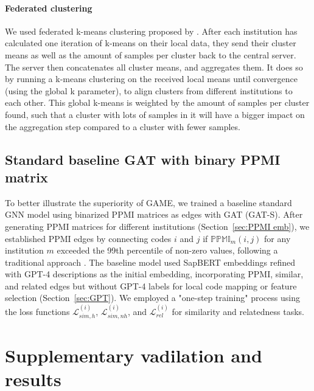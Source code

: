 \documentclass{article}
\begin{document}
\paragraph{Federated clustering}
We used federated k-means clustering proposed by \cite{garst2024fed}. After each institution has calculated one iteration of k-means on their local data, they send their cluster means as well as the amount of samples per cluster back to the central server. The server then concatenates all cluster means, and aggregates them. It does so by running a k-means clustering on the received local means until convergence (using the global k parameter), to align clusters from different institutions to each other. This global k-means is weighted by the amount of samples per cluster found, such that a cluster with lots of samples in it will have a bigger impact on the aggregation step compared to a cluster with
fewer samples.



\subsection{Standard baseline GAT with binary PPMI matrix}
\label{sec:naive}

To better illustrate the superiority of GAME, we trained a baseline standard GNN model using binarized PPMI matrices as edges with GAT (GAT-S). After generating PPMI matrices for different institutions (Section~\ref{sec:PPMI emb}), we established PPMI edges by connecting codes $i$ and $j$ if $\mathbb{PPMI}_{m}(i,j)$ for any institution $m$ exceeded the 99th percentile of non-zero values, following a traditional approach \cite{lee2020harmonized}. The baseline model used SapBERT embeddings refined with GPT-4 descriptions as the initial embedding, incorporating PPMI, similar, and related edges but without GPT-4 labels for local code mapping or feature selection (Section~\ref{sec:GPT}). We employed a "one-step training" process using the loss functions $\mathcal{L}^{(i)}_{sim,h}$, $\mathcal{L}^{(i)}_{sim,nh}$, and $\mathcal{L}^{(i)}_{rel}$ for similarity and relatedness tasks.


\section{Supplementary vadilation and results}
\label{sec:S2}
\end{document}
